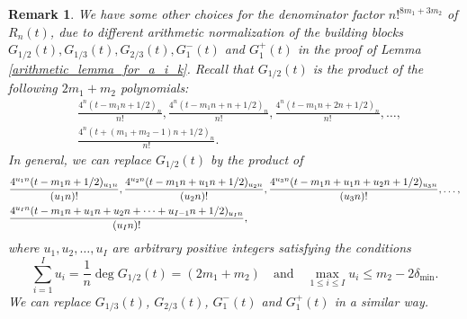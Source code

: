 \documentclass[11pt]{amsart}
\newtheorem{remark}[theorem]{Remark}
\numberwithin{equation}{section}
\begin{document}
\begin{remark}\label{rmk}
We have some other choices for the denominator factor $n!^{8m_1+3m_2}$ of $R_n(t)$, due to different arithmetic normalization of the building blocks $G_{1/2}(t),G_{1/3}(t),G_{2/3}(t),G_{1}^{-}(t)$ and $G_1^{+}(t)$ in the proof of Lemma \ref{arithmetic_lemma_for_a_i_k}. Recall that $G_{1/2}(t)$ is the product of the following $2m_1+m_2$ polynomials:
\begin{align*}
&\frac{4^{n}(t-m_{1}n+1/2)_n}{n!}, \frac{4^{n}(t-m_{1}n+n+1/2)_n}{n!}, \frac{4^{n}(t-m_{1}n+2n+1/2)_n}{n!},\ldots, \\
&\frac{4^{n}(t+(m_1+m_2-1)n+1/2)_n}{n!}.
\end{align*}
In general, we can replace $G_{1/2}(t)$ by the product of
\begin{align}\label{replacement}
&\frac{4^{u_{1}n}(t-m_{1}n+1/2)_{u_{1}n}}{(u_{1}n)!}, \frac{4^{u_{2}n}(t-m_{1}n+u_{1}n+1/2)_{u_{2}n}}{(u_{2}n)!},\frac{4^{u_{3}n}(t-m_{1}n+u_{1}n+u_{2}n+1/2)_{u_{3}n}}{(u_{3}n)!},\ldots, \notag \\
&\frac{4^{u_{I}n}(t-m_{1}n+u_{1}n+u_{2}n+\cdots+u_{I-1}n+1/2)_{u_{I}n}}{(u_{I}n)!},
\end{align}
where $u_1,u_2,\ldots,u_I$ are arbitrary positive integers satisfying the conditions
\begin{equation}\label{conditionsforbuildingblocks}
\sum_{i=1}^{I} u_i = \frac{1}{n}\deg G_{1/2}(t) =(2m_1+m_2) \quad \text{and} \quad \max_{1 \leqslant i \leqslant I} u_i \leqslant m_2-2\delta_{\min}. 
\end{equation}
We can replace $G_{1/3}(t)$, $G_{2/3}(t)$, $G_{1}^{-}(t)$ and $G_{1}^{+}(t)$ in a similar way.


\end{remark}
\end{document}
